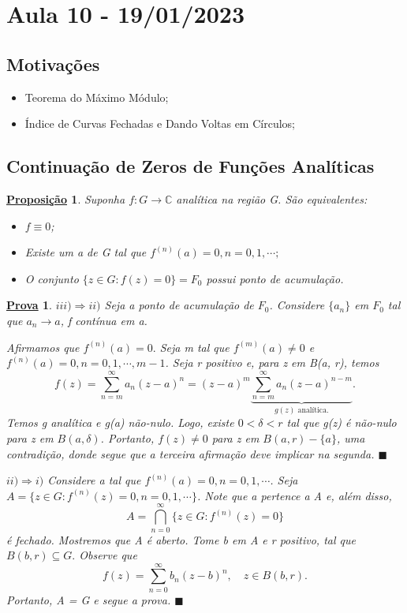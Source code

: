 \documentclass{article}
\newtheorem*{proof*}{\underline{Prova}}
\newtheorem*{prop*}{\underline{Proposi\c c\~ao}}
\renewcommand\qedsymbol{$\blacksquare$}
\begin{document}
  \section{Aula 10 - 19/01/2023}
  \subsection{Motiva\c c\~oes}
  \begin{itemize}
    \item Teorema do M\'aximo M\'odulo;
    \item \'Indice de Curvas Fechadas e Dando Voltas em C\'irculos;
  \end{itemize}

  \subsection{Continua\c c\~ao de Zeros de Fun\c c\~oes Anal\'iticas}
  \begin{prop*}
    Suponha $f:G\rightarrow \mathbb{C}$ anal\'itica na regi\~ao G. S\~ao equivalentes:
    \begin{itemize}
      \item[i)] $f\equiv0$;
      \item[ii)] Existe um a de G tal que $f^{(n)}(a) = 0, n = 0, 1, \cdots;$
      \item[iii)] O conjunto $\{z\in{G}: f(z) = 0\} = F_{0} $ possui ponto de acumula\c c\~ao.
    \end{itemize}
  \end{prop*}
  \begin{proof*}
    $iii)\Rightarrow ii)$ Seja a ponto de acumula\c c\~ao de $F_{0}$. Considere $\{a_{n}\} $ em $F_{0}$ tal que $a_{n}\to{a}$, f cont\'inua em a.

    Afirmamos que $f^{(n)}(a) = 0.$  Seja m tal que $f^{(m)}(a)\neq 0 $ e $f^{(n)}(a) = 0, n = 0, 1, \cdots, m-1 $. Seja r positivo
    e, para z em B(a, r), temos 
    $$
    f(z) = \sum\limits_{n=m}^{\infty}a_{n}(z-a)^{n} = (z-a)^{m}\underbrace{\sum\limits_{n=m}^{\infty}a_{n}(z-a)^{n-m}}_{g(z)\text{ anal\'itica.}}.
    $$
    Temos g anal\'itica e g(a) n\~ao-nulo. Logo, existe $0 < \delta < r$ tal que g(z) \'e n\~ao-nulo para z em $B(a, \delta)$. Portanto,
    $f(z)\neq0$ para z em $B(a, r) - \{a\} $, uma contradi\c c\~ao, donde segue que a terceira afirma\c c\~ao deve implicar na segunda. \qedsymbol

    $ii)\Rightarrow i)$ Considere a tal que $f^{(n)}(a) = 0, n = 0, 1, \cdots$. Seja $A=\{z\in{G}: f^{(n)}(z) = 0, n=0, 1, \cdots\} $. Note que
    a pertence a A e, al\'em disso, 
    $$
    A = \bigcap_{n=0}^{\infty}\{z\in{G}: f^{(n)}(z) = 0\}
    $$
    \'e fechado. Mostremos que A \'e aberto. Tome b em A e r positivo, tal que $B(b, r)\subseteq{G}.$ Observe que 
    $$
    f(z) = \sum\limits_{n=0}^{\infty}b_{n}(z-b)^{n}, \quad z\in{B(b, r)}.
    $$
    Portanto, A = G e segue a prova. \qedsymbol
  \end{proof*}
\end{document}
